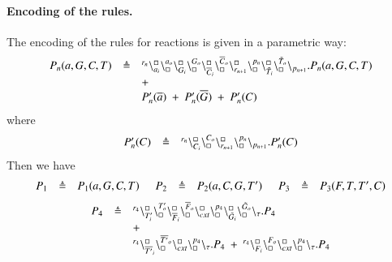 \paragraph{Encoding of the rules.}
The encoding of the rules for reactions is  given in a parametric way:
\[
\begin{array}{lcl}
P_n(a,G,C,T) & \triangleq &{}^{r_n}\backslash_{a_i}^{\scriptstyle {\square}}\backslash_{\scriptstyle {\square}}^{a_o}
                                                    \backslash_{G_i}^{\scriptstyle {\square}}\backslash_{\scriptstyle {\square}}^{G_o}
                                                     \backslash_{\overline{C}_i}^{\scriptstyle {\square}}\backslash_{\scriptstyle {\square}}^{\overline{C}_o}
					        \backslash_{r_{n+1}}^{\scriptstyle {\square}}\backslash_{\scriptstyle {\square}}^{p_n}
					        \backslash_{\tilde{T}_i}^{\scriptstyle {\square}}\backslash_{\scriptstyle {\square}}^{\tilde{T}_o}
			\backslash_{p_{n+1}}.P_n(a,G,C,T)  \\
				&& +\\
			&&P_n'(\overline{a}) \ +\ P_n'(\overline{G}) \ + \ P_n'(C)\\
			\end{array}
			\]
			\noindent
			where
			\[
\begin{array}{lcl}
P_n'(C) &\triangleq &  {}^{r_n}\backslash_{C_i}^{\scriptstyle {\square}}\backslash_{\scriptstyle {\square}}^{C_o}\backslash_{r_{n+1}}^{\scriptstyle {\square}}\backslash_{\scriptstyle {\square}}^{p_n} \backslash_{p_{n+1}}.P_n'(C) 
\end{array}
\]
\noindent
Then we have 
\[
\begin{array}{lcl @{\hspace{0.5cm}}lcl @{\hspace{0.5cm}}lcl }
P_1 & \defeq & P_1(a,G,C,T) &   P_2 & \defeq & P_2(a,C,G,T') &   P_3 & \defeq & P_3(F,T,T',C)  \\
\end{array}
\]
\[
\begin{array}{lcl}
P_4 & \triangleq &{}^{r_4}\backslash_{T'_i}^{\scriptstyle {\square}}\backslash_{\scriptstyle {\square}}^{T'_o}
                                                     \backslash_{\overline{F}_i}^{\scriptstyle {\square}}\backslash_{\scriptstyle {\square}}^{\overline{F}_o}
					        \backslash_{cxt}^{\scriptstyle {\square}}\backslash_{\scriptstyle {\square}}^{p_4}
					        \backslash_{\tilde{G}_i}^{\scriptstyle {\square}}\backslash_{\scriptstyle {\square}}^{\tilde{G}_o}
			\backslash_{\tau}.P_4  \\
				&& +\\
&&{}^{r_4}\backslash_{\overline{T'}_i}^{\scriptstyle {\square}}\backslash_{\scriptstyle {\square}}^{\overline{T'}_o}\backslash_{cxt}^{\scriptstyle {\square}}\backslash_{\scriptstyle {\square}}^{p_4} \backslash_{\tau}.P_4 \ +\  {}^{r_4}\backslash_{F_i}^{\scriptstyle {\square}}\backslash_{\scriptstyle {\square}}^{F_o}\backslash_{cxt}^{\scriptstyle {\square}}\backslash_{\scriptstyle {\square}}^{p_4} \backslash_{\tau}.P_4
\end{array}
\]
\noindent
